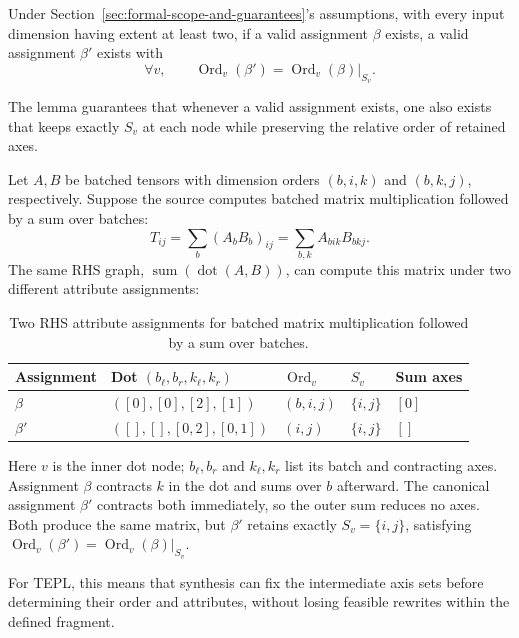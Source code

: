 \begin{lemma}
\label{lem:canonicalization}
Under Section~\ref{sec:formal-scope-and-guarantees}'s assumptions, with every input dimension
having extent at least two, if a valid assignment $\beta$ exists, a valid
assignment $\beta'$ exists with
\begin{equation}
 \forall v,\qquad
 \operatorname{Ord}_v(\beta')=\operatorname{Ord}_v(\beta)|_{S_v}.
 \label{eq:canonicalization}
\end{equation}
\end{lemma}
The lemma guarantees that whenever a valid assignment exists, one also
exists that keeps exactly $S_v$ at each node while preserving the relative
order of retained axes.

Let $A,B$ be batched tensors with dimension orders $(b,i,k)$
and $(b,k,j)$, respectively. Suppose the source computes batched matrix
multiplication followed by a sum over batches:
\[
 T_{ij}=\sum_b(A_bB_b)_{ij}=\sum_{b,k}A_{bik}B_{bkj}.
\]
The same RHS graph, $\operatorname{sum}(\operatorname{dot}(A,B))$, can
compute this matrix under two different attribute assignments:
\begin{table}[!htbp]
\caption{Two RHS attribute assignments for batched matrix multiplication followed by a sum over batches.}
\label{tab:canonical-example}
\centering
\small
\begin{tabular}{@{}lllll@{}}\toprule
Assignment & Dot $(b_\ell,b_r,k_\ell,k_r)$ & $\operatorname{Ord}_v$ & $S_v$ & Sum axes\\\midrule
$\beta$ & $([0],[0],[2],[1])$ & $(b,i,j)$ & $\{i,j\}$ & $[0]$\\
$\beta'$ & $([],[],[0,2],[0,1])$ & $(i,j)$ & $\{i,j\}$ & $[]$\\\bottomrule
\end{tabular}
\end{table}
Here $v$ is the inner dot node; $b_\ell,b_r$ and $k_\ell,k_r$ list its
batch and contracting axes. Assignment $\beta$ contracts $k$ in the dot
and sums over $b$ afterward. The canonical assignment $\beta'$ contracts
both immediately, so the outer sum reduces no axes. Both produce the same
matrix, but $\beta'$ retains exactly $S_v=\{i,j\}$, satisfying
$\operatorname{Ord}_v(\beta')=\operatorname{Ord}_v(\beta)|_{S_v}$.

For TEPL, this means that synthesis can fix the intermediate axis sets
before determining their order and attributes, without losing feasible
rewrites within the defined fragment.


